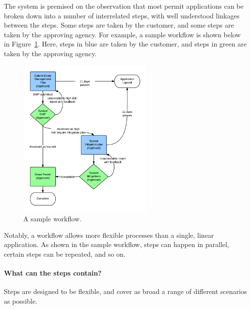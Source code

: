 \documentclass[12pt,a4paper,twosided]{article}
\begin{document}
The system is premised on the observation that most permit applications can be broken down into a number of interrelated steps, with well understood linkages between the steps. Some steps are taken by the customer, and some steps are taken by the approving agency. For example, a sample workflow is shown below in Figure~\ref{fig:sample-workflow}. Here, steps in blue are taken by the customer, and steps in green are taken by the approving agency.

\begin{figure}[h!]
  \centering
  \includegraphics[width=0.6\textwidth]{sample-workflow.png}  
  \caption{A sample workflow.}
  \label{fig:sample-workflow}
\end{figure}

Notably, a workflow allows more flexible processes than a single, linear application. As shown in the sample workflow, steps can happen in parallel, certain steps can be repeated, and so on.

\paragraph{What can the steps contain?}

Steps are designed to be flexible, and cover as broad a range of different scenarios as possible.
\end{document}
